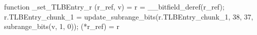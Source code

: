 function _set_TLBEntry_r (r_ref, v) = {
    r = __bitfield_deref(r_ref);
    r.TLBEntry_chunk_1 = update_subrange_bits(r.TLBEntry_chunk_1, 38, 37, subrange_bits(v, 1, 0));
    (*r_ref) = r
}
